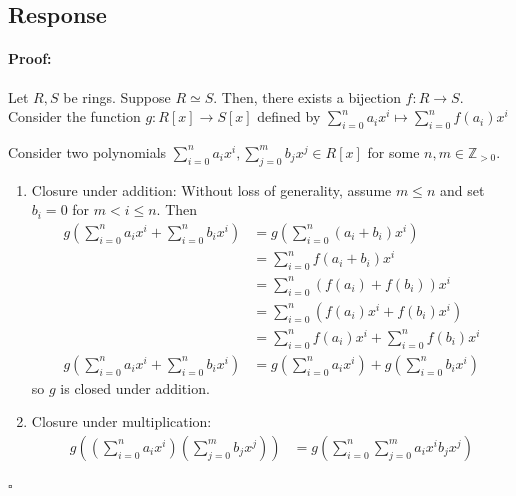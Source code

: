 \documentclass [12pt] {article}
\newcommand{\Z}{\mathbb{Z}}
\newenvironment{proof}{\paragraph{Proof:}}{\hfill$\square$}
\begin{document}
\subsection*{Response}
\begin{proof}
    Let $R, S$ be rings. Suppose $R \simeq S$. Then, there exists a bijection $f : R \to S$. 
    Consider the function $g : R[x] \to S[x]$ defined by 
    $\sum^{n}_{i = 0} a_i x^i \mapsto \sum^{n}_{i = 0} f(a_i) x^i$ \vspace{12pt}

    Consider two polynomials 
    $\sum^{n}_{i = 0} a_i x^i, \sum^{m}_{j = 0} b_j x^j \in R[x]$ for some $n, m \in \Z_{>0}$.
    \begin{enumerate}
        \item Closure under addition: Without loss of generality, assume $m \leq n$ and set 
            $b_i = 0$ for $m < i \leq n$. Then
            \begin{align*}
                g
                \left(
                    \sum^{n}_{i = 0} a_i x^i + \sum^{n}_{i = 0} b_i x^i
                \right) 
                &= g 
                \left( 
                    \sum^{n}_{i = 0} (a_i + b_i) x^i
                \right) \\
                &= \sum^{n}_{i = 0} f(a_i + b_i) x^i \\
                &= \sum^{n}_{i = 0} (f(a_i) + f(b_i)) x^i \\
                &= \sum^{n}_{i = 0} \left( f(a_i) x^i + f(b_i) x^i \right) \\
                &= \sum^{n}_{i = 0} f(a_i) x^i + \sum^{n}_{i = 0} f(b_i) x^i \\
                g
                \left(
                    \sum^{n}_{i = 0} a_i x^i + \sum^{n}_{i = 0} b_i x^i
                \right)
                &= g 
                \left( 
                    \sum^{n}_{i = 0} a_i x^i 
                \right)
                + 
                g
                \left( 
                    \sum^{n}_{i = 0} b_i x^i
                \right)
            \end{align*}
            so $g$ is closed under addition.
        \item Closure under multiplication:
            \begin{align*}
                g
                \left(
                    \left(\sum^{n}_{i = 0} a_i x^i \right)
                    \left(\sum^{m}_{j = 0} b_j x^j \right)
                \right) 
                &= 
                g \left(\sum^{n}_{i = 0} \sum^{m}_{j = 0} a_i x^i b_j x^j \right) \\

\end{align*}
\end{enumerate}
\end{proof}
\end{document}
